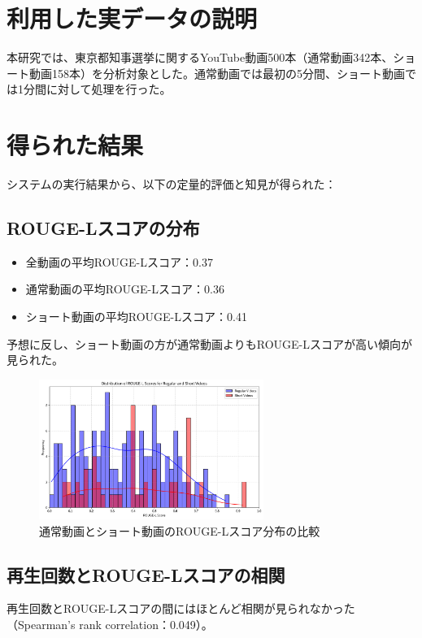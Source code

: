 \documentclass[11pt, a4paper]{ltjsarticle}
\begin{document}
\section{利用した実データの説明}
本研究では、東京都知事選挙に関するYouTube動画500本（通常動画342本、ショート動画158本）を分析対象とした。通常動画では最初の5分間、ショート動画では1分間に対して処理を行った。

\section{得られた結果}
システムの実行結果から、以下の定量的評価と知見が得られた：

\subsection{ROUGE-Lスコアの分布}
\begin{itemize}
  \item 全動画の平均ROUGE-Lスコア：0.37
  \item 通常動画の平均ROUGE-Lスコア：0.36
  \item ショート動画の平均ROUGE-Lスコア：0.41
\end{itemize}

予想に反し、ショート動画の方が通常動画よりもROUGE-Lスコアが高い傾向が見られた。

\begin{figure}[htbp]
  \centering
  \includegraphics[width=0.65\textwidth]{../results/img/rouge_l_histogram_comparison.png}
  \caption{通常動画とショート動画のROUGE-Lスコア分布の比較}
\end{figure}

\subsection{再生回数とROUGE-Lスコアの相関}
再生回数とROUGE-Lスコアの間にはほとんど相関が見られなかった（Spearman's rank correlation：0.049）。
\end{document}
